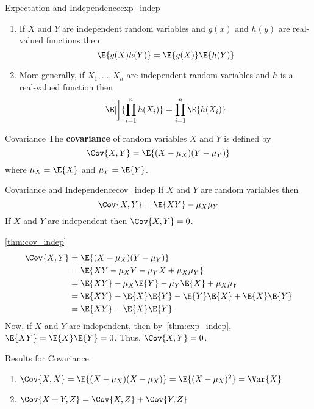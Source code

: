 \begin{Theorem}{Expectation and Independence}{exp_indep}
    \begin{enumerate}[label=(\arabic*)]
        \item If $ X $ and $ Y $ are independent
              random variables and $ g(x) $ and $ h(y) $
              are real-valued functions then
              \[ \E{g(X)h(Y)}=\E{g(X)}\E{h(Y)} \]
        \item More generally, if $ X_1,\ldots,X_n $ are independent
              random variables and $ h $
              is a real-valued function then
              \[ \E[\bigg]{\prod_{i=1}^n h(X_i)}=
                  \prod_{i=1}^n \E{h(X_i)} \]
    \end{enumerate}
\end{Theorem}
\begin{Definition}{Covariance}{}
    The \textbf{covariance} of
    random variables $ X $ and $ Y $ is defined by
    \[ \Cov{X,Y}=\E{(X-\mu_X)(Y-\mu_Y)} \]
    where $ \mu_X=\E{X} $ and $ \mu_Y=\E{Y} $.
\end{Definition}
\begin{Theorem}{Covariance and Independence}{cov_indep}
    If $ X $ and $ Y $ are random variables then
    \[ \Cov{X,Y}=\E{XY}-\mu_X\mu_Y \]
    If $ X $ and $ Y $ are independent then $ \Cov{X,Y}=0 $.
\end{Theorem}
\begin{Proof}{\ref{thm:cov_indep}}{}
    \begin{align*}
        \Cov{X,Y}
         & =\E{(X-\mu_X)(Y-\mu_Y)}                  \\
         & =\E{XY-\mu_X Y - \mu_Y X + \mu_X\mu_Y}   \\
         & =\E{XY}-\mu_X\E{Y}-\mu_Y\E{X}+\mu_X\mu_Y \\
         & =\E{XY}-\E{X}\E{Y}-\E{Y}\E{X}+\E{X}\E{Y} \\
         & =\E{XY}-\E{X}\E{Y}
    \end{align*}
    Now, if $ X $ and $ Y $ are independent, then
    by~\ref{thm:exp_indep}, $ \E{XY}=\E{X}\E{Y}=0 $. Thus,
    $ \Cov{X,Y}=0 $.
\end{Proof}
\begin{Theorem}{Results for Covariance}{}
    \begin{enumerate}[label=(\arabic*)]
        \item $ \Cov{X,X}=\E{(X-\mu_X)(X-\mu_X)}=\E{(X-\mu_X)^2}=\Var{X} $
        \item $ \Cov{X+Y,Z}=\Cov{X,Z}+\Cov{Y,Z} $
    \end{enumerate}
\end{Theorem}
